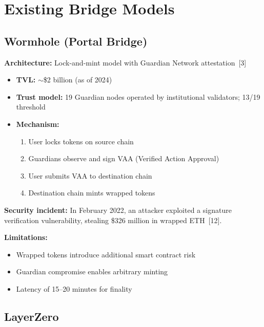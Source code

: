 \documentclass[11pt,a4paper,twoside]{article}
\begin{document}
\section{Existing Bridge Models}
\label{sec:existing}

\subsection{Wormhole (Portal Bridge)}

\textbf{Architecture:} Lock-and-mint model with Guardian Network attestation~[3]

\begin{itemize}
    \item \textbf{TVL:} $\sim$\$2 billion (as of 2024)
    \item \textbf{Trust model:} 19 Guardian nodes operated by institutional validators; 13/19 threshold
    \item \textbf{Mechanism:}
    \begin{enumerate}
        \item User locks tokens on source chain
        \item Guardians observe and sign VAA (Verified Action Approval)
        \item User submits VAA to destination chain
        \item Destination chain mints wrapped tokens
    \end{enumerate}
\end{itemize}

\textbf{Security incident:} In February 2022, an attacker exploited a signature verification vulnerability, stealing \$326 million in wrapped ETH~[12].

\textbf{Limitations:}
\begin{itemize}
    \item Wrapped tokens introduce additional smart contract risk
    \item Guardian compromise enables arbitrary minting
    \item Latency of 15--20 minutes for finality
\end{itemize}

\subsection{LayerZero}
\end{document}
